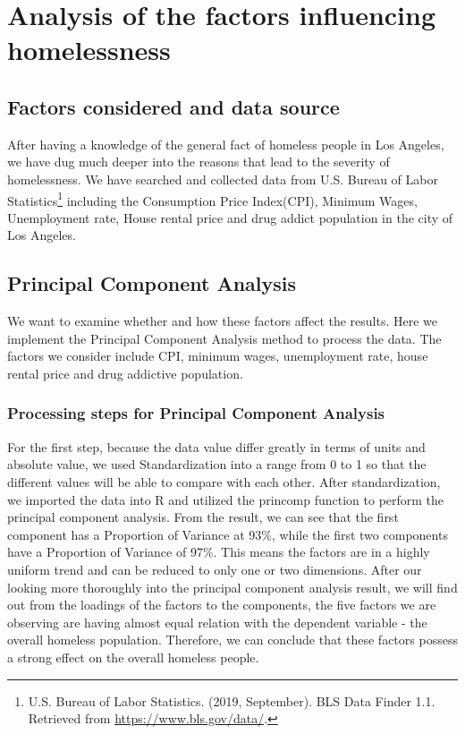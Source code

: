 \documentclass[]{article}
\let\rmarkdownfootnote\footnote%
\def\footnote{\protect\rmarkdownfootnote}
\begin{document}
\hypertarget{analysis-of-the-factors-influencing-homelessness}{%
\section{Analysis of the factors influencing
homelessness}\label{analysis-of-the-factors-influencing-homelessness}}

\hypertarget{factors-considered-and-data-source}{%
\subsection{Factors considered and data
source}\label{factors-considered-and-data-source}}

After having a knowledge of the general fact of homeless people in Los
Angeles, we have dug much deeper into the reasons that lead to the
severity of homelessness. We have searched and collected data from U.S.
Bureau of Labor Statistics\footnote{U.S. Bureau of Labor Statistics.
  (2019, September). BLS Data Finder 1.1. Retrieved from
  \url{https://www.bls.gov/data/}.} including the Consumption Price
Index(CPI), Minimum Wages, Unemployment rate, House rental price and
drug addict population in the city of Los Angeles.

\hypertarget{principal-component-analysis}{%
\subsection{Principal Component
Analysis}\label{principal-component-analysis}}

We want to examine whether and how these factors affect the results.
Here we implement the Principal Component Analysis method to process the
data. The factors we consider include CPI, minimum wages, unemployment
rate, house rental price and drug addictive population.

\hypertarget{processing-steps-for-principal-component-analysis}{%
\subsubsection{Processing steps for Principal Component
Analysis}\label{processing-steps-for-principal-component-analysis}}

For the first step, because the data value differ greatly in terms of
units and absolute value, we used Standardization into a range from 0 to
1 so that the different values will be able to compare with each other.
After standardization, we imported the data into R and utilized the
princomp function to perform the principal component analysis. From the
result, we can see that the first component has a Proportion of Variance
at 93\%, while the first two components have a Proportion of Variance of
97\%. This means the factors are in a highly uniform trend and can be
reduced to only one or two dimensions. After our looking more thoroughly
into the principal component analysis result, we will find out from the
loadings of the factors to the components, the five factors we are
observing are having almost equal relation with the dependent variable -
the overall homeless population. Therefore, we can conclude that these
factors possess a strong effect on the overall homeless people.
\end{document}
